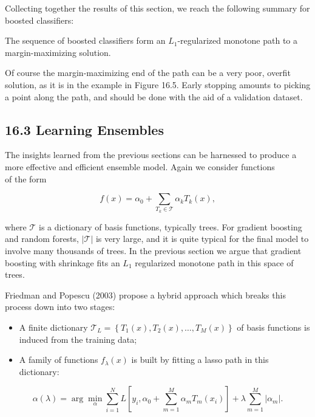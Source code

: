 \documentclass[10pt]{article}
\begin{document}
Collecting together the results of this section, we reach the following summary for boosted classifiers:

The sequence of boosted classifiers form an $L_{1}$-regularized monotone path to a margin-maximizing solution.

Of course the margin-maximizing end of the path can be a very poor, overfit solution, as it is in the example in Figure 16.5. Early stopping amounts to picking a point along the path, and should be done with the aid of a validation dataset.

\subsection*{16.3 Learning Ensembles}
The insights learned from the previous sections can be harnessed to produce a more effective and efficient ensemble model. Again we consider functions\\
of the form


\begin{equation*}
f(x)=\alpha_{0}+\sum_{T_{k} \in \mathcal{T}} \alpha_{k} T_{k}(x), \tag{16.8}
\end{equation*}


where $\mathcal{T}$ is a dictionary of basis functions, typically trees. For gradient boosting and random forests, $|\mathcal{T}|$ is very large, and it is quite typical for the final model to involve many thousands of trees. In the previous section we argue that gradient boosting with shrinkage fits an $L_{1}$ regularized monotone path in this space of trees.

Friedman and Popescu (2003) propose a hybrid approach which breaks this process down into two stages:

\begin{itemize}
  \item A finite dictionary $\mathcal{T}_{L}=\left\{T_{1}(x), T_{2}(x), \ldots, T_{M}(x)\right\}$ of basis functions is induced from the training data;
  \item A family of functions $f_{\lambda}(x)$ is built by fitting a lasso path in this dictionary:
\end{itemize}


\begin{equation*}
\alpha(\lambda)=\arg \min _{\alpha} \sum_{i=1}^{N} L\left[y_{i}, \alpha_{0}+\sum_{m=1}^{M} \alpha_{m} T_{m}\left(x_{i}\right)\right]+\lambda \sum_{m=1}^{M}\left|\alpha_{m}\right| . \tag{16.9}
\end{equation*}
\end{document}

